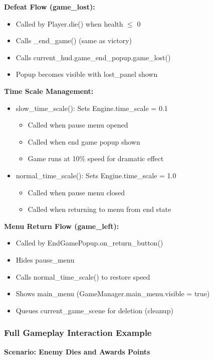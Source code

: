 \documentclass{article}
\begin{document}
\textbf{Defeat Flow (game\_lost):}
\begin{itemize}
    \item Called by Player.die() when health $\leq$ 0
    \item Calls \_end\_game() (same as victory)
    \item Calls current\_hud.game\_end\_popup.game\_lost()
    \item Popup becomes visible with lost\_panel shown
\end{itemize}

\textbf{Time Scale Management:}
\begin{itemize}
    \item slow\_time\_scale(): Sets Engine.time\_scale = 0.1
    \begin{itemize}
        \item Called when pause menu opened
        \item Called when end game popup shown
        \item Game runs at 10\% speed for dramatic effect
    \end{itemize}
    \item normal\_time\_scale(): Sets Engine.time\_scale = 1.0
    \begin{itemize}
        \item Called when pause menu closed
        \item Called when returning to menu from end state
    \end{itemize}
\end{itemize}

\textbf{Menu Return Flow (game\_left):}
\begin{itemize}
    \item Called by EndGamePopup.on\_return\_button()
    \item Hides pause\_menu
    \item Calls normal\_time\_scale() to restore speed
    \item Shows main\_menu (GameManager.main\_menu.visible = true)
    \item Queues current\_game\_scene for deletion (cleanup)
\end{itemize}

\subsubsection{Full Gameplay Interaction Example}

\textbf{Scenario: Enemy Dies and Awards Points}
\end{document}
